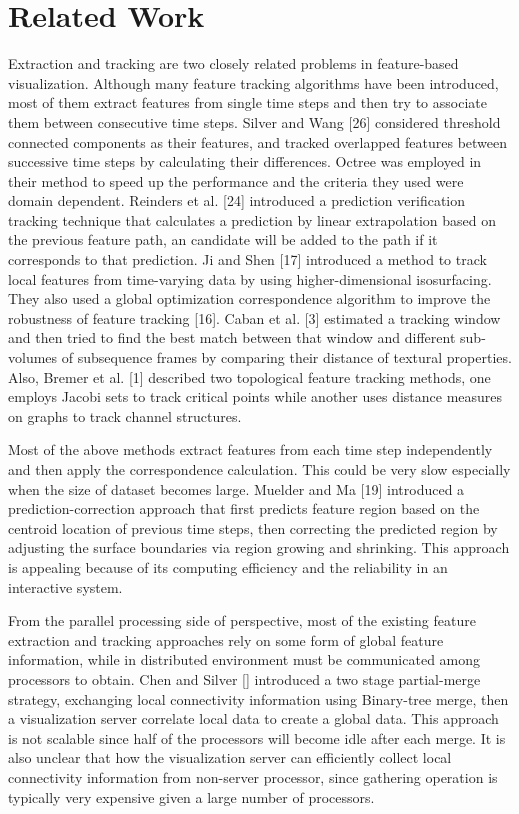 \documentclass[10pt, conference, compsocconf]{IEEEtran}
\begin{document}

\section{Related Work}
Extraction and tracking are two closely related problems in feature-based visualization. Although many feature tracking algorithms have been introduced, most of them extract features from single time steps and then try to associate them between consecutive time steps. Silver and Wang [26] considered threshold connected components as their features, and tracked overlapped features between successive time steps by calculating their differences. Octree was employed in their method to speed up the performance and the criteria they used were domain dependent. Reinders et al. [24] introduced a prediction verification tracking technique that calculates a prediction by linear extrapolation based on the previous feature path, an candidate will be added to the path if it corresponds to that prediction. Ji and Shen [17] introduced a method to track local features from time-varying data by using higher-dimensional isosurfacing. They also used a global optimization correspondence algorithm to improve the robustness of feature tracking [16]. Caban et al. [3] estimated  a tracking window and then tried to find the best match between that window and different sub-volumes of subsequence frames by comparing their distance of textural properties.  Also, Bremer et al. [1] described two topological feature tracking methods, one employs Jacobi sets to track critical points while another uses distance measures on graphs to track channel structures. 

Most of the above methods extract features from each time step independently and then apply the correspondence calculation. This could be very slow especially when the size of dataset becomes large. Muelder and Ma [19] introduced a prediction-correction approach that first predicts feature region based on the centroid location of previous time steps, then correcting the predicted region by adjusting the surface boundaries via region growing and shrinking. This approach is appealing because of its computing efficiency and the reliability in an interactive system.

From the parallel processing side of perspective, most of the existing feature extraction and tracking approaches rely on some form of global feature information, while in distributed environment must be communicated among processors to obtain. Chen and Silver [] introduced a two stage partial-merge strategy, exchanging local connectivity information using Binary-tree merge, then a visualization server correlate local data to create a global data. This approach is not scalable since half of the processors will become idle after each merge. It is also unclear that how the visualization server can efficiently collect local connectivity information from non-server processor, since gathering operation is typically very expensive given a large number of processors. 
\end{document}
